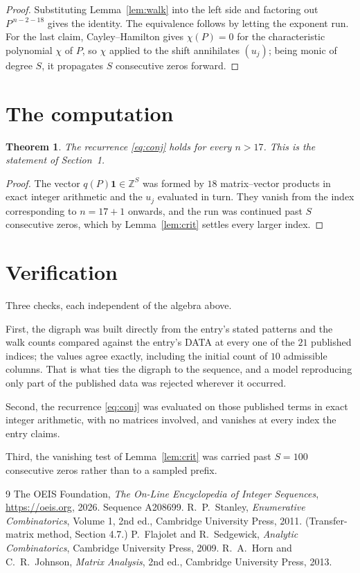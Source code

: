 \documentclass[11pt,a4paper]{article}
\theoremstyle{plain}
\newtheorem{theorem}{Theorem}
\theoremstyle{definition}
\begin{document}
\begin{proof}
Substituting Lemma~\ref{lem:walk} into the left side and factoring out
$P^{\,n-2-18}$ gives the identity. The equivalence follows by letting the exponent
run. For the last claim, Cayley--Hamilton gives $\chi(P)=0$ for the characteristic
polynomial $\chi$ of $P$, so $\chi$ applied to the shift annihilates $(u_j)$; being monic of
degree $S$, it propagates $S$ consecutive zeros forward.
\end{proof}

\section{The computation}

\begin{theorem}
The recurrence \eqref{eq:conj} holds for every $n>17$. This is the statement of
Section~1.
\end{theorem}

\begin{proof}
The vector $q(P)\mathbf{1}\in\mathbb{Z}^{S}$ was formed by $18$ matrix--vector
products in exact integer arithmetic and the $u_j$ evaluated in turn. They vanish from the
index corresponding to $n=17+1$ onwards, and the run was continued past $S$ consecutive
zeros, which by Lemma~\ref{lem:crit} settles every larger index.
\end{proof}

\section{Verification}

Three checks, each independent of the algebra above.

First, the digraph was built directly from the entry's stated patterns and the walk counts
compared against the entry's DATA at every one of the $21$ published indices; the
values agree exactly, including the initial count of $10$ admissible columns. That is
what ties the digraph to the sequence, and a model reproducing only part of the published
data was rejected wherever it occurred.

Second, the recurrence \eqref{eq:conj} was evaluated on those published terms in exact
integer arithmetic, with no matrices involved, and vanishes at every index the entry claims.

Third, the vanishing test of Lemma~\ref{lem:crit} was carried past $S=100$ consecutive
zeros rather than to a sampled prefix.

\begin{thebibliography}{9}
 The OEIS Foundation, \emph{The On-Line Encyclopedia of Integer
Sequences}, \url{https://oeis.org}, 2026. Sequence A208699.
 R.~P.~Stanley, \emph{Enumerative Combinatorics}, Volume 1, 2nd ed.,
Cambridge University Press, 2011. (Transfer-matrix method, Section 4.7.)
 P.~Flajolet and R.~Sedgewick, \emph{Analytic Combinatorics}, Cambridge
University Press, 2009.
 R.~A.~Horn and C.~R.~Johnson, \emph{Matrix Analysis}, 2nd ed., Cambridge
University Press, 2013.
\end{thebibliography}
\end{document}
